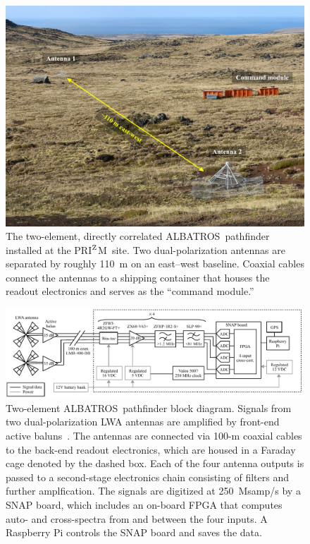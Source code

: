 \documentclass{ws-jai}
\def\albatros{ALBATROS}
\def\prizm{PRI$^{\rm Z}$M}
\begin{document}
\begin{figure}
  \begin{center}
    \includegraphics[width=0.7\linewidth]{Figures/albatros_2elem/albatros_2elem.pdf}
    \caption{The two-element, directly correlated
      \albatros\ pathfinder installed at the \prizm\ site.  Two
      dual-polarization antennas are separated by roughly 110~m on an
      east--west baseline. Coaxial cables connect the antennas to a
      shipping container that houses the readout electronics and
      serves as the ``command module.''}
    \label{Fig:albatros2}
  \end{center}
\end{figure}

\begin{figure}
  \begin{center} \includegraphics[width=1.0\linewidth]{Figures/albatros_2elem_schematic/albatros_2elem_schematic.pdf}
    \caption{Two-element \albatros\ pathfinder block diagram.  Signals
      from two dual-polarization LWA antennas are amplified by
      front-end active baluns~\citep{2012PASP..124.1090H}.  The
      antennas are connected via 100-m coaxial cables to the back-end
      readout electronics, which are housed in a Faraday cage denoted
      by the dashed box.  Each of the four antenna outputs is passed
      to a second-stage electronics chain consisting of filters and
      further amplfication.  The signals are digitized at 250~Msamp/s
      by a SNAP board, which includes an on-board FPGA that computes
      auto- and cross-spectra from and between the four inputs.  A
      Raspberry Pi controls the SNAP board and saves the data.}
    \label{Fig:albatros2_schem}
  \end{center}
\end{figure}
\end{document}
